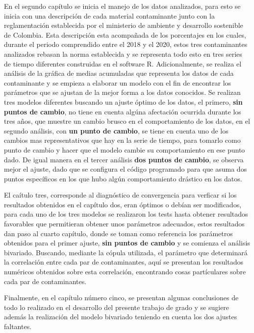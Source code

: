 En el segundo capítulo se inicia el manejo de los datos analizados, para esto se inicia con una descripción de cada material contaminante junto con la reglamentación establecida por el ministerio de ambiente y desarrollo sostenible de Colombia. Esta descripción esta acompañada de los porcentajes en los cuales, durante el periodo comprendido entre el 2018 y el 2020, estos tres contaminantes analizados rebasan la norma establecida y se representa todo esto en tres series de tiempo diferentes construidas en el software R. Adicionalmente, se realiza el análisis de la gráfica de medias acumuladas que representa los datos de cada contaminante y se empieza a elaborar un modelo con el fin de encontrar los parámetros que se ajustan de la mejor forma a los datos conocidos. Se realizan tres modelos diferentes buscando un ajuste óptimo de los datos, el primero, \textbf{sin puntos de cambio}, no tiene en cuenta algúna afectación ocurrida durante los tres años, que muestre un cambio brusco en el comportamiento de los datos, en el segundo análisis, con \textbf{un punto de cambio}, se tiene en cuenta uno de los cambios mas representativos que hay en la serie de tiempo, para tomarlo como punto de cambio y hacer que el modelo cambie su comportamiento en ese punto dado. De igual manera en el tercer análisis \textbf{dos puntos de cambio}, se observa mejor el ajuste, dado que se configura el código programado para que asuma dos puntos específicos en los que hubo algún comportamiento drástico en los datos. 

El caítulo tres, corresponde al diagnóstico de convergencia para verficar si los resultados obtenidos en el capítulo dos, eran óptimos o debían ser modificados, para cada uno de los tres modelos se realizaron los tests hasta obtener resultados favorables que permitieran obtener unos parámetros adecuados, estos resultados dan paso al cuarto capítulo, donde se toman como referencia los parámetros obtenidos para el primer ajuste, \textbf{sin puntos de cambio} y se comienza el análisis bivariado. Buscando, mediante la cópula utilizada, el parámetro que determinará la correlación entre cada par de contaminantes, aquí se presentan los resultados numéricos obtenidos sobre esta correlación, encontrando cosas partículares sobre cada par de contaminantes. 

Finalmente, en el capítulo número cinco, se presentan algunas conclusiones de todo lo realizado en el desarrollo del presente trabajo de grado y se sugiere además la realización del modelo bivariado teniendo en cuenta los dos ajustes faltantes. 